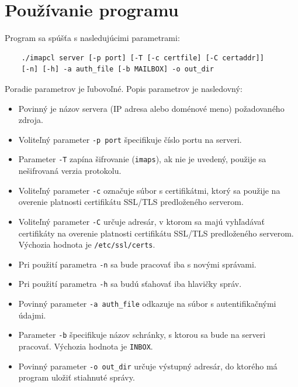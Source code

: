 \documentclass[a4paper, 11pt]{article}
\begin{document}
	\section{Používanie programu}
	Program sa spúšťa s nasledujúcimi parametrami:
	\begin{lstlisting}
	./imapcl server [-p port] [-T [-c certfile] [-C certaddr]]
	[-n] [-h] -a auth_file [-b MAILBOX] -o out_dir
	\end{lstlisting}		
	Poradie parametrov je ľubovoľné. Popis parametrov je nasledovný:
	\begin{itemize}
		\item Povinný je názov servera (IP adresa alebo doménové meno) požadovaného zdroja.
		\item Voliteľný parameter \texttt{-p port} špecifikuje číslo portu na serveri. 
		\item Parameter \texttt{-T} zapína šifrovanie (\texttt{imaps}), ak nie je uvedený, použije sa nešifrovaná verzia protokolu.
		\item Voliteľný parameter \texttt{-c} označuje súbor s certifikátmi, ktorý sa použije na overenie platnosti certifikátu SSL/TLS predloženého serverom.
		\item Voliteľný parameter \texttt{-C} určuje adresár, v ktorom sa majú vyhľadávať certifikáty na overenie platnosti certifikátu SSL/TLS predloženého serverom. Výchozia hodnota je \texttt{/etc/ssl/certs}.
		\item Pri použití parametra \texttt{-n} sa bude pracovať iba s novými správami.
		\item Pri použití parametra \texttt{-h} sa budú sťahovať iba hlavičky správ.
		\item Povinný parameter \texttt{-a auth\_file} odkazuje na súbor s autentifikačnými údajmi.
		\item Parameter \texttt{-b} špecifikuje názov schránky, s ktorou sa bude na serveri pracovať. Výchozia hodnota je \texttt{INBOX}.
		\item Povinný parameter \texttt{-o out\_dir} určuje výstupný adresár, do ktorého má program uložiť stiahnuté správy.
	\end{itemize}
\end{document}

